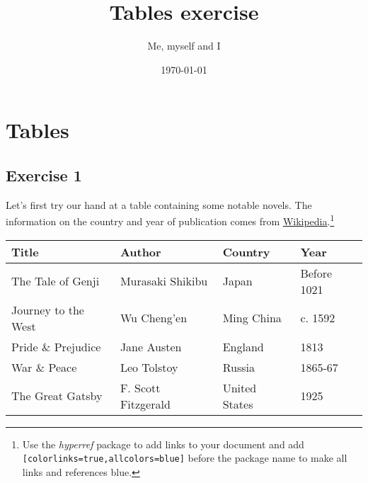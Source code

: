 \documentclass[a4paper]{article}
\title{Tables exercise}
\author{Me, myself and I}
\date{\today}
\begin{document}
\maketitle
	
\section*{Tables}
\subsection*{Exercise 1}

\noindent Let's first try our hand at a table containing some notable novels. The information on the country and year of publication comes from \href{https://en.wikipedia.org/wiki/Main_Page}{Wikipedia}.\footnote{Use the \textit{hyperref} package to add links to your document and add \texttt{[colorlinks=true,allcolors=blue]} before the package name to make all links and references blue.}

\begin{center}
\begin{tabular}{||l | l | l | l ||} 
 \hline
 \textbf{Title} & \textbf{Author} & \textbf{Country} & \textbf{Year}\\ [1mm] 
 \hline
 \hline 
 The Tale of Genji & Murasaki Shikibu & Japan & Before 1021 \\  
 \hline
 Journey to the West & Wu Cheng'en & Ming China & c. 1592 \\
 \hline
 Pride \& Prejudice & Jane Austen & England & 1813 \\ 
 \hline
 War \& Peace & Leo Tolstoy & Russia & 1865-67 \\
 \hline
  The Great Gatsby & F. Scott Fitzgerald & United States & 1925 \\
 \hline
\end{tabular}
\end{center}

		
\end{document}
